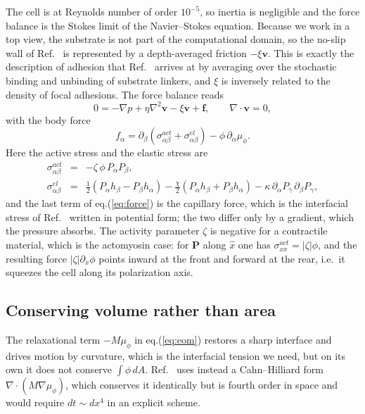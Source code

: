 \documentclass[11pt]{article}
\begin{document}
The cell is at Reynolds number of order $10^{-5}$, so inertia is negligible and
the force balance is the Stokes limit of the Navier--Stokes equation. Because we
work in a top view, the substrate is not part of the computational domain, so the
no-slip wall of Ref.~\cite{Tjhung:2015} is represented by a depth-averaged
friction $-\xi\mathbf{v}$. This is exactly the description of adhesion that
Ref.~\cite{Leoni:2017} arrives at by averaging over the stochastic binding and
unbinding of substrate linkers, and $\xi$ is inversely related to the density of
focal adhesions. The force balance reads
\begin{equation}\label{eq:stokes}
0=-\nabla p+\eta\nabla^{2}\mathbf{v}-\xi\mathbf{v}+\mathbf{f},
\qquad \nabla\cdot\mathbf{v}=0,
\end{equation}
with the body force
\begin{equation}\label{eq:force}
f_\alpha=\partial_\beta\left(\sigma^{act}_{\alpha\beta}
+\sigma^{el}_{\alpha\beta}\right)-\phi\,\partial_\alpha\mu_\phi.
\end{equation}
Here the active stress and the elastic stress are
\begin{eqnarray}\label{eq:stresses}
\sigma^{act}_{\alpha\beta}&=&-\zeta\,\phi\,P_\alpha P_\beta,\nonumber\\
\sigma^{el}_{\alpha\beta}&=&\frac{1}{2}\left(P_\alpha h_\beta-P_\beta h_\alpha\right)
-\frac{\chi}{2}\left(P_\alpha h_\beta+P_\beta h_\alpha\right)
-\kappa\,\partial_\alpha P_\gamma\,\partial_\beta P_\gamma,
\end{eqnarray}
and the last term of eq.(\ref{eq:force}) is the capillary force, which is the
interfacial stress of Ref.~\cite{Tjhung:2015} written in potential form; the two
differ only by a gradient, which the pressure absorbs. The activity parameter
$\zeta$ is negative for a contractile material, which is the actomyosin case: for
$\mathbf{P}$ along $\hat{x}$ one has $\sigma^{act}_{xx}=|\zeta|\phi$, and the
resulting force $|\zeta|\partial_x\phi$ points inward at the front and forward at
the rear, i.e.\ it squeezes the cell along its polarization axis.

\noindent
\subsection{Conserving volume rather than area}
\label{subsec:volume}

The relaxational term $-M\mu_\phi$ in eq.(\ref{eq:eom}) restores a sharp
interface and drives motion by curvature, which is the interfacial tension we
need, but on its own it does not conserve $\int\phi\,dA$. Ref.~\cite{Tjhung:2015}
uses instead a Cahn--Hilliard form $\nabla\cdot(M\nabla\mu_\phi)$, which
conserves it identically but is fourth order in space and would require
$dt\sim dx^{4}$ in an explicit scheme.
\end{document}
